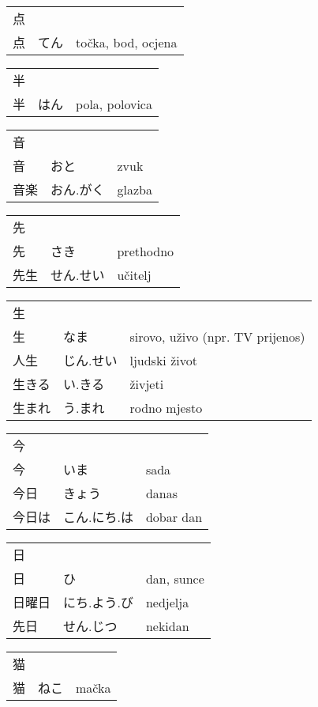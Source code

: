 

\newenvironment{dictentry}[1]{
	\begin{tabular}{p{2cm} p{3cm} p{10cm}}
		#1 &&\\
}{
	\end{tabular}
	\vspace{20pt}
}

\newcommand{\example}[3]{
	\hspace*{\fill}#1 & #2 & #3\\
}

\author{ロボット君}


\begin{dictentry}{点}
\example{点}{てん}{točka, bod, ocjena}
\end{dictentry}

\begin{dictentry}{半}
\example{半}{はん}{pola, polovica}
\end{dictentry}

\begin{dictentry}{音}
\example{音}{おと}{zvuk}
\example{音楽}{おん.がく}{glazba}
\end{dictentry}

\begin{dictentry}{先}
\example{先}{さき}{prethodno}
\example{先生}{せん.せい}{učitelj}
\end{dictentry}

\begin{dictentry}{生}
\example{生}{なま}{sirovo, uživo (npr. TV prijenos)}
\example{人生}{じん.せい}{ljudski život}
\example{生きる}{い.きる}{živjeti}
\example{生まれ}{う.まれ}{rodno mjesto}
\end{dictentry}

\begin{dictentry}{今}
\example{今}{いま}{sada}
\example{今日}{きょう}{danas}
\example{今日は}{こん.にち.は}{dobar dan}
\end{dictentry}

\begin{dictentry}{日}
\example{日}{ひ}{dan, sunce}
\example{日曜日}{にち.よう.び}{nedjelja}
\example{先日}{せん.じつ}{nekidan}
\end{dictentry}

\begin{dictentry}{猫}
\example{猫}{ねこ}{mačka}
\end{dictentry}

